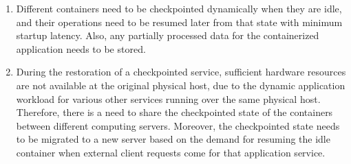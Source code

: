 \documentclass[conference]{IEEEtran}
\begin{document}
\begin{enumerate}[i]
\item Different containers need to be checkpointed dynamically when they are idle, and their operations need
to be resumed later from that state with minimum
startup latency. Also, any partially processed data for
the containerized application needs to be stored.
\item During the restoration of a checkpointed service, sufficient hardware resources are not available at the original
physical host, due to the dynamic application workload
for various other services running over the same physical
host. Therefore, there is a need to share the checkpointed
state of the containers between different computing
servers. Moreover, the checkpointed state needs to be
migrated to a new server based on the demand for
resuming the idle container when external client requests
come for that application service.
\end{enumerate}
\end{document}
